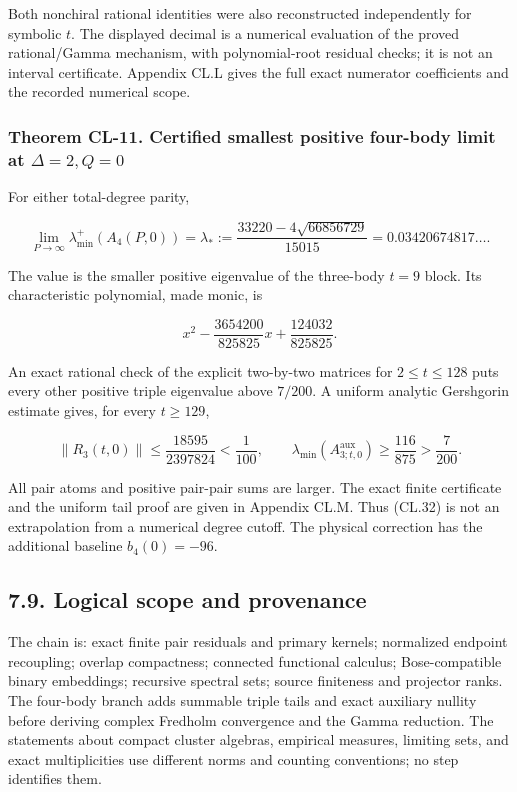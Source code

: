 Both nonchiral rational identities were also reconstructed independently for symbolic \(t\). The displayed decimal is a numerical evaluation of the proved rational/Gamma mechanism, with polynomial-root residual checks; it is not an interval certificate. Appendix CL.L gives the full exact numerator coefficients and the recorded numerical scope.

\hypertarget{theorem-cl-11.-certified-smallest-positive-four-body-limit-at-delta2q0}{%
\subsubsection{\texorpdfstring{Theorem CL-11. Certified smallest positive four-body limit at \(\Delta=2,Q=0\)}{Theorem CL-11. Certified smallest positive four-body limit at \textbackslash Delta=2,Q=0}}\label{theorem-cl-11.-certified-smallest-positive-four-body-limit-at-delta2q0}}

For either total-degree parity,

\[
\lim_{P\to\infty}\lambda_{\min}^+(A_4(P,0))
=\lambda_*:=\frac{33220-4\sqrt{66856729}}{15015}
=0.03420674817\ldots.
\tag{CL.32}
\]

The value is the smaller positive eigenvalue of the three-body \(t=9\) block. Its characteristic polynomial, made monic, is

\[
x^2-\frac{3654200}{825825}x+\frac{124032}{825825}.
\]

An exact rational check of the explicit two-by-two matrices for \(2\leq t\leq128\) puts every other positive triple eigenvalue above \(7/200\). A uniform analytic Gershgorin estimate gives, for every \(t\geq129\),

\[
\|R_3(t,0)\|\leq\frac{18595}{2397824}<\frac1{100},
\qquad
\lambda_{\min}(A_{3;t,0}^{\mathrm{aux}})\geq\frac{116}{875}>
\frac7{200}.
\tag{CL.33}
\]

All pair atoms and positive pair-pair sums are larger. The exact finite certificate and the uniform tail proof are given in Appendix CL.M. Thus (CL.32) is not an extrapolation from a numerical degree cutoff. The physical correction has the additional baseline \(b_4(0)=-96\).

\hypertarget{logical-scope-and-provenance}{%
\subsection{7.9. Logical scope and provenance}\label{logical-scope-and-provenance}}

The chain is: exact finite pair residuals and primary kernels; normalized endpoint recoupling; overlap compactness; connected functional calculus; Bose-compatible binary embeddings; recursive spectral sets; source finiteness and projector ranks. The four-body branch adds summable triple tails and exact auxiliary nullity before deriving complex Fredholm convergence and the Gamma reduction. The statements about compact cluster algebras, empirical measures, limiting sets, and exact multiplicities use different norms and counting conventions; no step identifies them.

